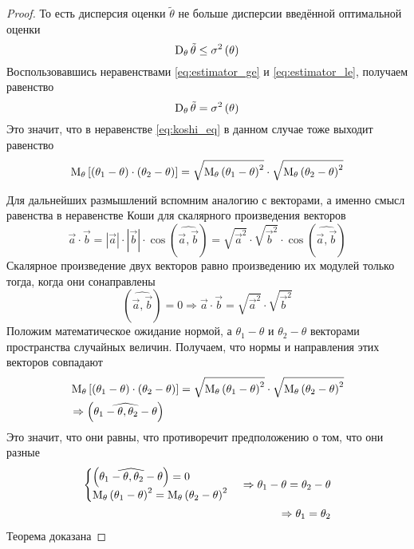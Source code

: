 \begin{proof}
  То есть дисперсия оценки $\tilde{\theta}$ не больше дисперсии
  введённой оптимальной оценки
  \begin{equation}\label{eq:estimator_le}
    \operatorname{D}_{\theta} \tilde{\theta}\le\sigma^2\left(\theta\right)
  \end{equation}
  Воспользовавшись неравенствами
  \eqref{eq:estimator_ge} и \eqref{eq:estimator_le}, получаем равенство
  $$\operatorname{D}_{\theta} \tilde{\theta}= \sigma^2\left(\theta\right)$$
  Это значит, что в неравенстве \eqref{eq:koshi_eq}
  в данном случае тоже выходит равенство
  $$\operatorname{M}_{\theta} \left[ \left( \theta_1-\theta \right)
      \cdot \left( \theta_2-\theta \right) \right]
    = \sqrt{\operatorname{M}_{\theta} \left( \theta_1-\theta \right)^2}
      \cdot \sqrt{\operatorname{M}_{\theta} \left( \theta_2-\theta \right)^2}$$

  Для дальнейших размышлений вспомним аналогию с векторами,
  а именно смысл равенства в неравенстве Коши
  для скалярного произведения векторов
  $$\vec{a}\cdot \vec{b}
    = \left|\vec{a}\right|\cdot \left|\vec{b}\right|
      \cdot \cos{\left(\widehat{\vec{a},\vec{b}}\right)}
    = \sqrt{\vec{a}^2}\cdot \sqrt{\vec{b}^2}
      \cdot \cos{\left(\widehat{\vec{a},\vec{b}}\right)}$$
  Скалярное произведение двух векторов равно произведению их модулей
  только тогда, когда они сонаправлены
  $$\left(\widehat{\vec{a},\vec{b}}\right)=0
    \Rightarrow \vec{a}\cdot \vec{b}
    = \sqrt{\vec{a}^2}\cdot \sqrt{\vec{b}^2}$$
  Положим математическое ожидание нормой,
  а $\theta_1-\theta$ и $\theta_2-\theta$ векторами
  пространства случайных величин.
  Получаем, что нормы и направления этих векторов совпадают
  \begin{align*}
    &\operatorname{M}_{\theta} \left[ \left( \theta_1-\theta \right)
      \cdot \left( \theta_2-\theta \right) \right]
    = \sqrt{\operatorname{M}_{\theta} \left( \theta_1-\theta \right)^2}
      \cdot \sqrt{\operatorname{M}_{\theta} \left( \theta_2-\theta \right)^2}\\
    &\Rightarrow\left(\widehat{\theta_1-\theta,\theta_2-\theta}\right)\\
    \end{align*}
  Это значит, что они равны,
  что противоречит предположению о том, что они разные
  \begin{align*}
    \begin{cases}
      \left(\widehat{\theta_1-\theta,\theta_2-\theta}\right)=0\\
      \operatorname{M}_{\theta} \left( \theta_1-\theta \right)^2
        = \operatorname{M}_{\theta} \left( \theta_2-\theta \right)^2
    \end{cases}
    \Rightarrow \theta_1-\theta= \theta_2-\theta\\
    \Rightarrow\theta_1= \theta_2
  \end{align*}
  Теорема доказана
\end{proof}

